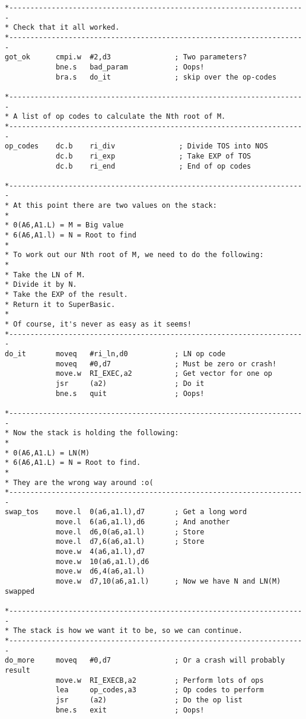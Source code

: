 \begin{lstlisting}[firstnumber=1,caption={The Maths Package - Calculate Any Root},label={lst:MathsPackageAnyRoot}]
*----------------------------------------------------------------------
* Check that it all worked.
*----------------------------------------------------------------------
got_ok      cmpi.w  #2,d3               ; Two parameters?
            bne.s   bad_param           ; Oops!
            bra.s   do_it               ; skip over the op-codes

*----------------------------------------------------------------------
* A list of op codes to calculate the Nth root of M.
*----------------------------------------------------------------------
op_codes    dc.b    ri_div               ; Divide TOS into NOS
            dc.b    ri_exp               ; Take EXP of TOS
            dc.b    ri_end               ; End of op codes

*----------------------------------------------------------------------
* At this point there are two values on the stack:
*
* 0(A6,A1.L) = M = Big value
* 6(A6,A1.l) = N = Root to find
*
* To work out our Nth root of M, we need to do the following:
*
* Take the LN of M.
* Divide it by N.
* Take the EXP of the result.
* Return it to SuperBasic.
*
* Of course, it's never as easy as it seems!
*----------------------------------------------------------------------
do_it       moveq   #ri_ln,d0           ; LN op code
            moveq   #0,d7               ; Must be zero or crash!
            move.w  RI_EXEC,a2          ; Get vector for one op
            jsr     (a2)                ; Do it
            bne.s   quit                ; Oops!

*----------------------------------------------------------------------
* Now the stack is holding the following:
*
* 0(A6,A1.L) = LN(M)
* 6(A6,A1.L) = N = Root to find.
*
* They are the wrong way around :o(
*----------------------------------------------------------------------
swap_tos    move.l  0(a6,a1.l),d7       ; Get a long word
            move.l  6(a6,a1.l),d6       ; And another
            move.l  d6,0(a6,a1.l)       ; Store
            move.l  d7,6(a6,a1.l)       ; Store
            move.w  4(a6,a1.l),d7
            move.w  10(a6,a1.l),d6
            move.w  d6,4(a6,a1.l)
            move.w  d7,10(a6,a1.l)      ; Now we have N and LN(M) swapped

*----------------------------------------------------------------------
* The stack is how we want it to be, so we can continue.
*----------------------------------------------------------------------
do_more     moveq   #0,d7               ; Or a crash will probably result
            move.w  RI_EXECB,a2         ; Perform lots of ops
            lea     op_codes,a3         ; Op codes to perform
            jsr     (a2)                ; Do the op list
            bne.s   exit                ; Oops!


\end{lstlisting}
